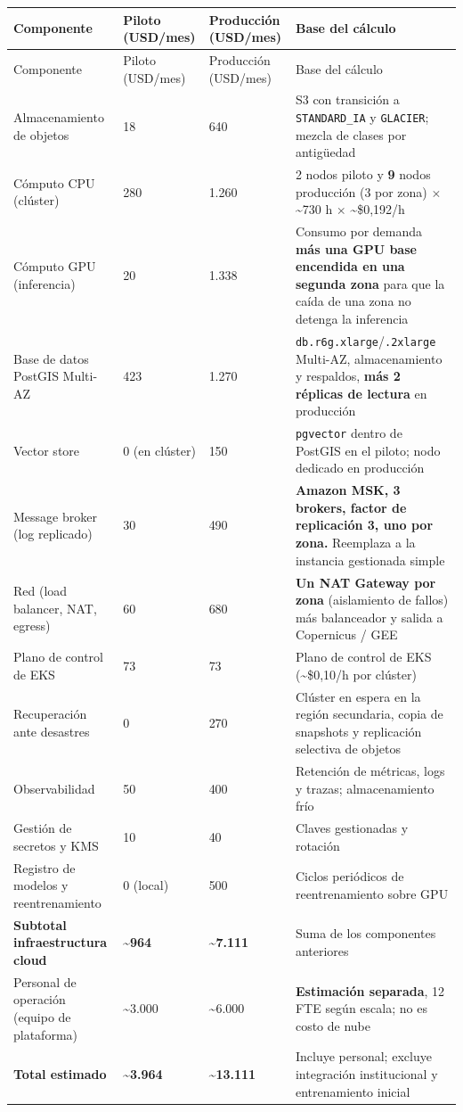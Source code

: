 \documentclass{article}
\begin{document}
{\small
\begin{longtable}{@{}L{1.31in}L{0.53in}L{0.75in}L{3.36in}@{}}
\toprule
Componente & Piloto (USD/mes) & Producción (USD/mes) & Base del cálculo \\
\midrule
\endfirsthead
\toprule
Componente & Piloto (USD/mes) & Producción (USD/mes) & Base del cálculo \\
\midrule
\endhead
\bottomrule
\endlastfoot
Almacenamiento de objetos & 18 & 640 & S3 con transición a \texttt{STANDARD\_\allowbreak{}IA} y \texttt{GLACIER}; mezcla de clases por antigüedad \\
Cómputo CPU (clúster) & 280 & 1.260 & 2 nodos piloto y \textbf{9} nodos producción (3 por zona) \ensuremath{\times} \textasciitilde{}730 h \ensuremath{\times} \textasciitilde{}\$0,192/h \\
Cómputo GPU (inferencia) & 20 & 1.338 & Consumo por demanda \textbf{más una GPU base encendida en una segunda zona} para que la caída de una zona no detenga la inferencia \\
Base de datos PostGIS Multi-AZ & 423 & 1.270 & \texttt{db.\allowbreak{}r6g.\allowbreak{}xlarge}/\texttt{.\allowbreak{}2xlarge} Multi-AZ, almacenamiento y respaldos, \textbf{más 2 réplicas de lectura} en producción \\
Vector store & 0 (en clúster) & 150 & \texttt{pgvector} dentro de PostGIS en el piloto; nodo dedicado en producción \\
Message broker (log replicado) & 30 & 490 & \textbf{Amazon MSK, 3 brokers, factor de replicación 3, uno por zona.} Reemplaza a la instancia gestionada simple \\
Red (load balancer, NAT, egress) & 60 & 680 & \textbf{Un NAT Gateway por zona} (aislamiento de fallos) más balanceador y salida a Copernicus / GEE \\
Plano de control de EKS & 73 & 73 & Plano de control de EKS (\textasciitilde{}\$0,10/h por clúster) \\
Recuperación ante desastres & 0 & 270 & Clúster en espera en la región secundaria, copia de snapshots y replicación selectiva de objetos \\
Observabilidad & 50 & 400 & Retención de métricas, logs y trazas; almacenamiento frío \\
Gestión de secretos y KMS & 10 & 40 & Claves gestionadas y rotación \\
Registro de modelos y reentrenamiento & 0 (local) & 500 & Ciclos periódicos de reentrenamiento sobre GPU \\
\textbf{Subtotal infraestructura cloud} & \textbf{\textasciitilde{}964} & \textbf{\textasciitilde{}7.111} & Suma de los componentes anteriores \\
Personal de operación (equipo de plataforma) & \textasciitilde{}3.000 & \textasciitilde{}6.000 & \textbf{Estimación separada}, 1\textendash{}2 FTE según escala; no es costo de nube \\
\textbf{Total estimado} & \textbf{\textasciitilde{}3.964} & \textbf{\textasciitilde{}13.111} & Incluye personal; excluye integración institucional y entrenamiento inicial \\
\end{longtable}
}
\end{document}
